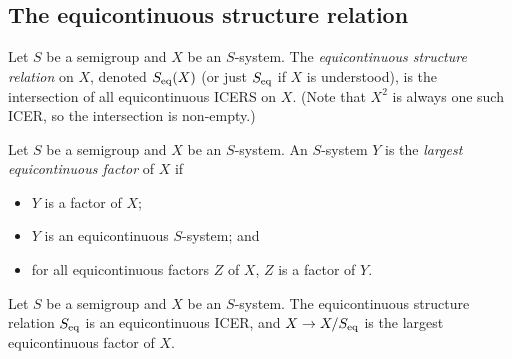 \subsection{The equicontinuous structure relation}

\begin{definition}
\label{def_equicontinuous_structure_relation}
\leanok{}
    Let $S$ be a semigroup and $X$ be an $S$-system.  The \emph{equicontinuous structure relation} on $X$, denoted $S_\text{eq}(X)$ (or just $S_\text{eq}$ if $X$ is understood), is the intersection of all equicontinuous ICERS on $X$.  (Note that $X^2$ is always one such ICER, so the intersection is non-empty.)
\end{definition}



\begin{definition}
    \label{def_largest_equi_factor}
    Let $S$ be a semigroup and $X$ be an $S$-system.  An $S$-system $Y$ is the \emph{largest equicontinuous factor} of $X$ if
    \begin{itemize}
        \item $Y$ is a factor of $X$;
        \item $Y$ is an equicontinuous $S$-system; and
        \item for all equicontinuous factors $Z$ of $X$, $Z$ is a factor of $Y$.
    \end{itemize}
\end{definition}

\begin{lemma}
\label{lemma_seq_is_equi_and_largest}
    Let $S$ be a semigroup and $X$ be an $S$-system.  The equicontinuous structure relation $S_\text{eq}$ is an equicontinuous ICER, and $X \to X/S_\text{eq}$ is the largest equicontinuous factor of $X$.
\end{lemma}

